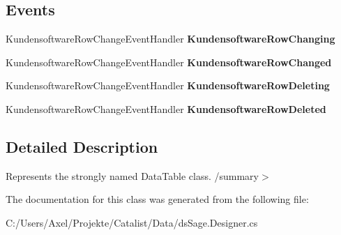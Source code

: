 \subsection*{Events}
\begin{DoxyCompactItemize}
\item 
Kundensoftware\+Row\+Change\+Event\+Handler {\bfseries Kundensoftware\+Row\+Changing}\hypertarget{class_products_1_1_data_1_1ds_sage_1_1_kundensoftware_data_table_acd01038a63317e944eb9eab8b2fe49e0}{}\label{class_products_1_1_data_1_1ds_sage_1_1_kundensoftware_data_table_acd01038a63317e944eb9eab8b2fe49e0}

\item 
Kundensoftware\+Row\+Change\+Event\+Handler {\bfseries Kundensoftware\+Row\+Changed}\hypertarget{class_products_1_1_data_1_1ds_sage_1_1_kundensoftware_data_table_a9a771331e60d322fcc9bfe6703365903}{}\label{class_products_1_1_data_1_1ds_sage_1_1_kundensoftware_data_table_a9a771331e60d322fcc9bfe6703365903}

\item 
Kundensoftware\+Row\+Change\+Event\+Handler {\bfseries Kundensoftware\+Row\+Deleting}\hypertarget{class_products_1_1_data_1_1ds_sage_1_1_kundensoftware_data_table_afa40e54e73f8a530ab8837d2fff266b8}{}\label{class_products_1_1_data_1_1ds_sage_1_1_kundensoftware_data_table_afa40e54e73f8a530ab8837d2fff266b8}

\item 
Kundensoftware\+Row\+Change\+Event\+Handler {\bfseries Kundensoftware\+Row\+Deleted}\hypertarget{class_products_1_1_data_1_1ds_sage_1_1_kundensoftware_data_table_a3a4bb2b7340b232b5d93efbdd9326ba9}{}\label{class_products_1_1_data_1_1ds_sage_1_1_kundensoftware_data_table_a3a4bb2b7340b232b5d93efbdd9326ba9}

\end{DoxyCompactItemize}


\subsection{Detailed Description}
Represents the strongly named Data\+Table class. /summary$>$ 

The documentation for this class was generated from the following file\+:\begin{DoxyCompactItemize}
\item 
C\+:/\+Users/\+Axel/\+Projekte/\+Catalist/\+Data/ds\+Sage.\+Designer.\+cs\end{DoxyCompactItemize}
